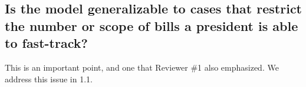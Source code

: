 \documentclass[article,letterpaper,times,12pt,listings-bw,microtype]{article}
\begin{document}






\subsection{Is the model generalizable to cases that restrict the number or scope of bills a president is able to fast-track?}
This is an important point, and one that  Reviewer \#1 also emphasized. We address this issue in 1.1.


\end{document}
